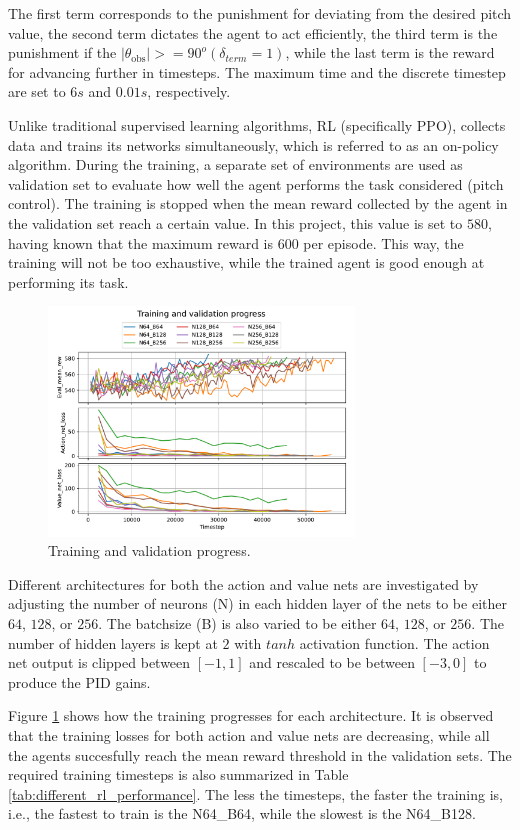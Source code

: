\documentclass[lettersize,journal]{IEEEtran}
\begin{document}
The first term corresponds to the punishment for deviating from the desired pitch value, the second term dictates the agent to act efficiently, the third term is the punishment if the $|\theta_{\mathrm{obs}}|>=90^{o} (\delta_{term}=1)$, while the last term is the reward for advancing further in timesteps. The maximum time and the discrete timestep are set to $6 s$ and $0.01 s$, respectively.

Unlike traditional supervised learning algorithms, RL (specifically PPO), collects data and trains its networks simultaneously, which is referred to as an on-policy algorithm. During the training, a separate set of environments are used as validation set to evaluate how well the agent performs the task considered (pitch control). The training is stopped when the mean reward collected by the agent in the validation set reach a certain value. In this project, this value is set to $580$, having known that the maximum reward is $600$ per episode. This way, the training will not be too exhaustive, while the trained agent is good enough at performing its task.

\begin{figure}[!t]
\centering
\includegraphics[width=3.2in]{figs/training_and_validation_progress.pdf}
\caption{Training and validation progress.}
\label{fig:training_and_validation_progress}
\end{figure}

Different architectures for both the action and value nets are investigated by adjusting the number of neurons (N) in each hidden layer of the nets to be either $64$, $128$, or $256$. The batchsize (B) is also varied to be either $64$, $128$, or $256$. The number of hidden layers is kept at $2$ with $tanh$ activation function. The action net output is clipped between $[-1,1]$ and rescaled to be between $[-3,0]$ to produce the PID gains.

Figure \ref{fig:training_and_validation_progress} shows how the training progresses for each architecture. It is observed that the training losses for both action and value nets are decreasing, while all the agents succesfully reach the mean reward threshold in the validation sets. The required training timesteps is also summarized in Table \ref{tab:different_rl_performance}. The less the timesteps, the faster the training is, i.e., the fastest to train is the N64\_B64, while the slowest is the N64\_B128.
\end{document}
